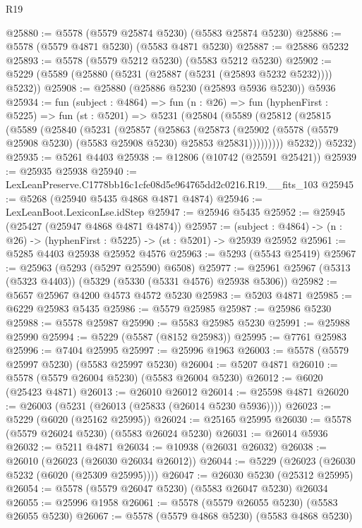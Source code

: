 \begin{lexlean}{R19}
\begin{coremodule}
@25880 := @5578 (@5579 @25874 @5230) (@5583 @25874 @5230)
@25886 := @5578 (@5579 @4871 @5230) (@5583 @4871 @5230)
@25887 := @25886 @5232
@25893 := @5578 (@5579 @5212 @5230) (@5583 @5212 @5230)
@25902 := @5229 (@5589 (@25880 (@5231 (@25887 (@5231 (@25893 @5232 @5232)))) @5232))
@25908 := @25880 (@25886 @5230 (@25893 @5936 @5230)) @5936
@25934 := fun (subject : @4864) =>
  fun (n : @26) =>
  fun (hyphenFirst : @5225) =>
  fun (st : @5201) =>
  @5231
    (@25804
      (@5589
        (@25812
          (@25815
            (@5589
              (@25840
                (@5231
                  (@25857
                    (@25863
                      (@25873
                        (@25902
                          (@5578 (@5579 @25908 @5230) (@5583 @25908 @5230) @25853 @25831)))))))))
          @5232))
      @5232)
@25935 := @5261 @4403
@25938 := @12806 (@10742 (@25591 @25421))
@25939 := @25935 @25938
@25940 := LexLeanPreserve.C1778bb16c1cfe08d5e964765dd2c0216.R19.__fits_103
@25945 := @5268 (@25940 @5435 @4868 @4871 @4874)
@25946 := LexLeanBoot.LexiconLse.idStep
@25947 := @25946 @5435
@25952 := @25945 (@25427 (@25947 @4868 @4871 @4874))
@25957 := (subject : @4864) -> (n : @26) -> (hyphenFirst : @5225) -> (st : @5201) -> @25939 @25952
@25961 := @5285 @4403 @25938 @25952 @4576
@25963 := @5293 (@5543 @25419)
@25967 := @25963 (@5293 (@5297 @25590) @6508)
@25977 := @25961 @25967 (@5313 (@5323 @4403)) (@5329 (@5330 (@5331 @4576) @25938 @5306))
@25982 := @5657 @25967 @4200 @4573 @4572 @5230
@25983 := @5203 @4871
@25985 := @6229 @25983 @5435
@25986 := @5579 @25985
@25987 := @25986 @5230
@25988 := @5578 @25987
@25990 := @5583 @25985 @5230
@25991 := @25988 @25990
@25994 := @5229 (@5587 (@8152 @25983))
@25995 := @7761 @25983
@25996 := @7404 @25995
@25997 := @25996 @1963
@26003 := @5578 (@5579 @25997 @5230) (@5583 @25997 @5230)
@26004 := @5207 @4871
@26010 := @5578 (@5579 @26004 @5230) (@5583 @26004 @5230)
@26012 := @6020 (@25423 @4871)
@26013 := @26010 @26012
@26014 := @25598 @4871
@26020 := @26003 (@5231 (@26013 (@25833 (@26014 @5230 @5936))))
@26023 := @5229 (@6020 (@25162 @25995))
@26024 := @25165 @25995
@26030 := @5578 (@5579 @26024 @5230) (@5583 @26024 @5230)
@26031 := @26014 @5936
@26032 := @5211 @4871
@26034 := @10938 (@26031 @26032)
@26038 := @26010 (@26023 (@26030 @26034 @26012))
@26044 := @5229 (@26023 (@26030 @5232 (@6020 (@25309 @25995))))
@26047 := @26030 @5230 (@25312 @25995)
@26054 := @5578 (@5579 @26047 @5230) (@5583 @26047 @5230) @26034
@26055 := @25996 @1958
@26061 := @5578 (@5579 @26055 @5230) (@5583 @26055 @5230)
@26067 := @5578 (@5579 @4868 @5230) (@5583 @4868 @5230)

\end{coremodule}
\end{lexlean}
